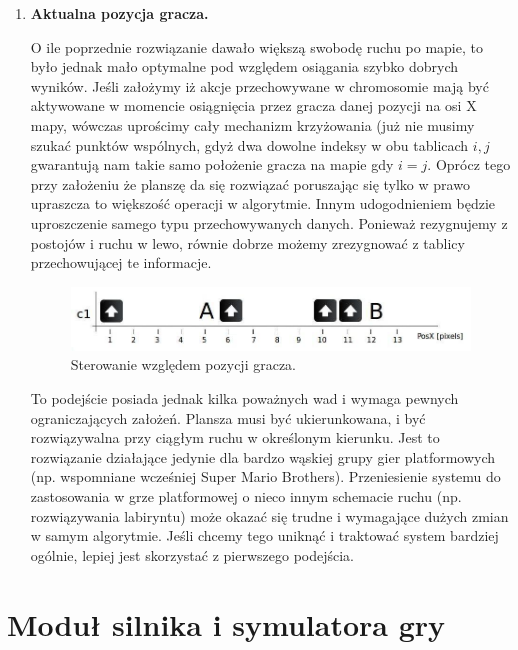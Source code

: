 \begin{par}
\begin{enumerate}
\begin{par}
	\end{par}
	\item
	{\bf Aktualna pozycja gracza.}
	\begin{par}
		O ile poprzednie rozwiązanie dawało większą swobodę ruchu po mapie, to było jednak mało optymalne pod względem osiągania szybko dobrych wyników.
		Jeśli założymy iż akcje przechowywane w chromosomie mają być aktywowane w momencie osiągnięcia przez gracza danej pozycji na osi X mapy, wówczas uprościmy cały mechanizm krzyżowania (już nie musimy szukać punktów wspólnych, gdyż dwa dowolne indeksy w obu tablicach $i,j$ gwarantują nam takie samo położenie gracza na mapie gdy $i=j$.
		Oprócz tego przy założeniu że planszę da się rozwiązać poruszając się tylko w prawo upraszcza to większość operacji w algorytmie.
		Innym udogodnieniem będzie uproszczenie samego typu przechowywanych danych. Ponieważ rezygnujemy z postojów i ruchu w lewo, równie dobrze możemy zrezygnować z tablicy przechowującej te informacje.

		\begin{par}
		\begin{figure}[!h]
		\centering
		\includegraphics[width=\textwidth]{obrazki/sterowanie2.jpg}
		\caption{Sterowanie względem pozycji gracza.}
		\label{fig:sterowanie2}
		\end{figure}
		\end{par}

		To podejście posiada jednak kilka poważnych wad i wymaga pewnych ograniczających założeń.
		Plansza musi być ukierunkowana, i być rozwiązywalna przy ciągłym ruchu w określonym kierunku.
		Jest to rozwiązanie działające jedynie dla bardzo wąskiej grupy gier platformowych (np. wspomniane wcześniej Super Mario Brothers).
		Przeniesienie systemu do zastosowania w grze platformowej o nieco innym schemacie ruchu (np. rozwiązywania labiryntu) może okazać się trudne i wymagające dużych zmian w samym algorytmie.
		Jeśli chcemy tego uniknąć i traktować system bardziej ogólnie, lepiej jest skorzystać z pierwszego podejścia.
	\end{par}
	\end{enumerate}
	\FloatBarrier
\end{par}
\section{Moduł silnika i symulatora gry}

